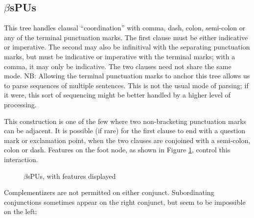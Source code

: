 \subsection{$\beta$sPUs}
\label{sPUs}

This tree handles clausal ``coordination'' with comma, dash, colon,
semi-colon or any of the terminal punctuation marks. The first clause
must be either indicative or imperative. The second may also be
infinitival with the separating punctuation marks, but must be
indicative or imperative with the terminal marks; with a comma, it may
only be indicative. The two clauses need not share the same mode. NB:
Allowing the terminal punctuation marks to anchor this tree allows us
to parse sequences of multiple sentences. This is not the usual mode
of parsing; if it were, this sort of sequencing might be better
handled by a higher level of processing.



This construction is one of the few where two non-bracketing
punctuation marks can be adjacent. It is possible (if rare) for the
first clause to end with a question mark or exclamation point, when
the two clauses are conjoined with a semi-colon, colon or
dash. Features on the foot node, as shown in Figure \ref{sPUs-tree}, control
this interaction.

\begin{figure}[hbt]
\centering
\hspace{0.0in}
\caption{$\beta$sPUs, with features displayed}
\label{sPUs-tree}
\end{figure}

Complementizers are not permitted on either conjunct. Subordinating
conjunctions sometimes appear on the right conjunct, but seem to be
impossible on the left:
        


